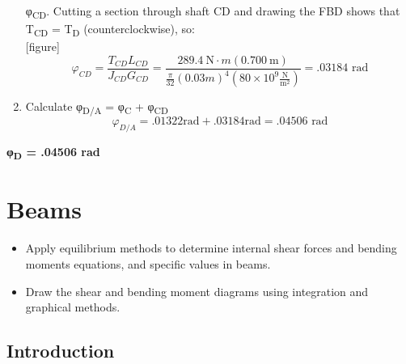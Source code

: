 \documentclass[
  letterpaper,
  DIV=11,
  numbers=noendperiod]{scrreprt}
\providecommand{\tightlist}{%
  \setlength{\itemsep}{0pt}\setlength{\parskip}{0pt}}\usepackage{longtable,booktabs,array}
\begin{document}
\begin{tcolorbox}
\begin{tcolorbox}
\begin{enumerate}
  φ\textsubscript{CD}. Cutting a section through shaft CD and drawing
  the FBD shows that T\textsubscript{CD} = T\textsubscript{D}
  (counterclockwise), so:\\
  {[}figure{]}\\
  \[
  \varphi_{C D}=\frac{T_{C D} L_{C D}}{J_{C D} G_{C D}}=\frac{289.4 \mathrm{~N} \cdot m(0.700 \mathrm{~m})}{\frac{\pi}{32}(0.03 m)^4\left(80 \times 10^9 \frac{\mathrm{N}}{\mathrm{m}^2}\right)}=.03184 \text{ rad}
  \]
\item
  Calculate φ\textsubscript{D/A} = φ\textsubscript{C} +
  φ\textsubscript{CD}\\
  \[
  \varphi_{D / A}=.01322 \mathrm{rad}+.03184 \mathrm{rad}=.04506 \text{ rad}
  \]
\end{enumerate}

\textbf{φ\textsubscript{D} = .04506 rad}

\end{tcolorbox}

\end{tcolorbox}


\chapter{Beams}\label{sec-beams}

\begin{tcolorbox}[enhanced jigsaw, breakable, opacityback=0, toptitle=1mm, left=2mm, colback=white, opacitybacktitle=0.6, colframe=quarto-callout-note-color-frame, titlerule=0mm, arc=.35mm, leftrule=.75mm, bottomtitle=1mm, colbacktitle=quarto-callout-note-color!10!white, rightrule=.15mm, title={Learning Objectives}, bottomrule=.15mm, toprule=.15mm, coltitle=black]

\begin{itemize}
\tightlist
\item
  Apply equilibrium methods to determine internal shear forces and
  bending moments equations, and specific values in beams.
\item
  Draw the shear and bending moment diagrams using integration and
  graphical methods.
\end{itemize}

\end{tcolorbox}

\section*{Introduction}\label{introduction-7}
\end{document}
